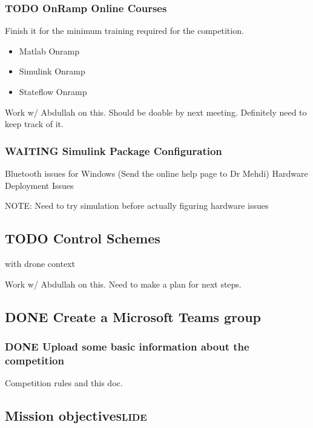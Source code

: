 \documentclass[11pt]{article}
\begin{document}
\subsubsection{{\bfseries\sffamily TODO} OnRamp Online Courses}
\label{sec:org3bd7591}
Finish it for the minimum training required for the competition.
\begin{itemize}
\item Matlab Onramp
\item Simulink Onramp
\item Stateflow Onramp
\end{itemize}

Work w/ Abdullah on this. Should be doable by next meeting.
Definitely need to keep track of it.

\subsubsection{{\bfseries\sffamily WAITING} Simulink Package Configuration}
\label{sec:org5124b88}
Bluetooth issues for Windows (Send the online help page to Dr Mehdi)
Hardware Deployment Issues

NOTE: Need to try simulation before actually figuring hardware issues

\subsection{{\bfseries\sffamily TODO} Control Schemes}
\label{sec:org4e3c594}
with drone context

Work w/ Abdullah on this.
Need to make a plan for next steps.

\subsection{{\bfseries\sffamily DONE} Create a Microsoft Teams group}
\label{sec:org82f593f}
\subsubsection{{\bfseries\sffamily DONE} Upload some basic information about the competition}
\label{sec:org8885332}
Competition rules and this doc.
\subsection{Mission objective\hfill{}\textsc{slide}}
\label{sec:orgf695192}
\end{document}
